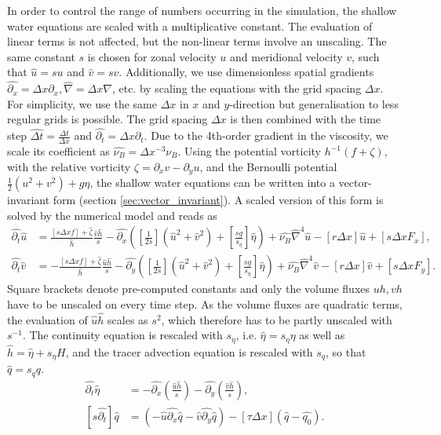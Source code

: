 In order to control the range of numbers occurring in the simulation, the shallow water equations are scaled with a multiplicative
constant. The evaluation of linear terms is not affected, but the non-linear terms involve an unscaling. The same constant $s$
is chosen for zonal velocity $u$  and meridional velocity $v$, such that $\hat{u} = su$ and $\hat{v} = sv$.
Additionally, we use dimensionless spatial gradients $\hat{\partial_x} = \Delta x \partial_x, \hat{\nabla} = \Delta x \nabla$, etc.
by scaling the equations with the grid spacing $\Delta x$. For simplicity, we use the same $\Delta x$ in $x$ and $y$-direction
but generalisation to less regular grids is possible. The grid spacing $\Delta x$ is then combined with the time step
$\widehat{\Delta t} = \tfrac{\Delta t}{\Delta x}$ and $\hat{\partial_t} = \Delta x \partial_t$. Due to the 4th-order gradient in the
viscosity, we scale its coefficient as $\hat{\nu_B} = \Delta x^{-3}\nu_B$. Using the potential vorticity $h^{-1}(f + \zeta)$,
with the relative vorticity $\zeta = \partial_xv - \partial_yu$, and the Bernoulli potential $\tfrac{1}{2}(u^2 + v^2) + g\eta$,
the shallow water equations can be written into a vector-invariant form (section \ref{sec:vector_invariant}). A scaled version
of this form is solved by the numerical model and reads as
\begin{align}
\hat{\partial_t}\hat{u} &= \frac{[s\Delta x f]+ \hat{\zeta}}{\hat{h}}\frac{\hat{v}\hat{h}}{s} -\hat{\partial_x}
\left([\frac{1}{2s}](\hat{u}^2 + \hat{v}^2) + [\frac{sg}{s_\eta}]\hat{\eta} \right) + \hat{\nu_B} \hat{\nabla}^4 \hat{u}
- [r\Delta x]\hat{u} + [s\Delta x F_x], \nonumber \\
\hat{\partial_t}\hat{v} &= - \frac{[s\Delta x f]+ \hat{\zeta}}{\hat{h}}\frac{\hat{u}\hat{h}}{s} -\hat{\partial_y}
\left([\frac{1}{2s}](\hat{u}^2 + \hat{v}^2) + [\frac{sg}{s_\eta}]\hat{\eta} \right) + \hat{\nu_B} \hat{\nabla}^4 \hat{v}
- [r\Delta x]\hat{v} + [s\Delta x F_y].
\end{align}
Square brackets denote pre-computed constants and only the volume fluxes $uh,vh$ have to be unscaled on every time step.
As the volume fluxes are quadratic terms, the evaluation of $\hat{u}\hat{h}$ scales as $s^2$, which therefore has to be
partly unscaled with $s^{-1}$. The continuity equation is rescaled with $s_\eta$, i.e. $\hat{\eta} = s_\eta \eta$ as well as
$\hat{h} = \hat{\eta} + s_\eta H$, and the tracer advection equation is rescaled with $s_q$, so that $\hat{q} = s_q q$.
\begin{align}
\hat{\partial_t} \hat{\eta} &= -\hat{\partial_x}(\frac{\hat{u}\hat{h}}{s}) - \hat{\partial_y}(\frac{\hat{v}\hat{h}}{s}), \nonumber \\
[s\hat{\partial_t}] \hat{q} &= \left(-\hat{u}\hat{\partial_x} \hat{q} - \hat{v}\hat{\partial_y} \hat{q}\right) - [\tau \Delta x](\hat{q} - \hat{q_0}).
\end{align}
